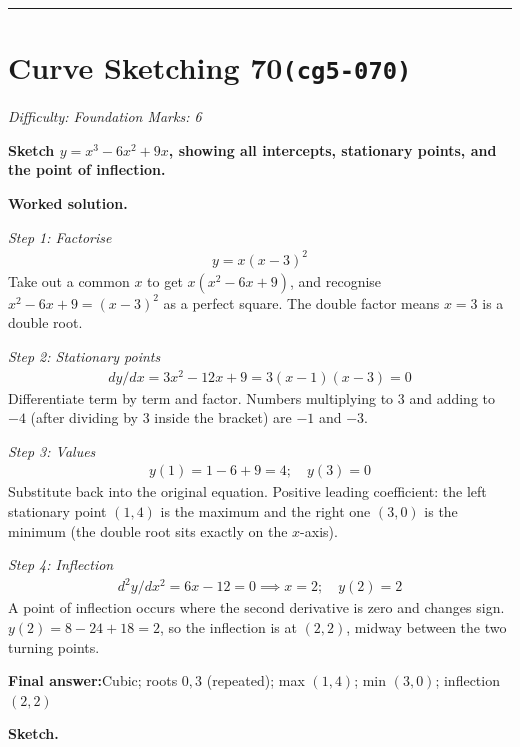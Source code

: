 \documentclass[11pt]{article}
\newcommand{\question}[1]{\par\medskip\noindent\textbf{#1}\par}
\begin{document}
\medskip\hrule

\section*{Curve Sketching 70\quad\small\texttt{(cg5-070)}}
\textit{Difficulty: Foundation \quad\textbar\quad Marks: 6}

\question{Sketch \( y = x^3 - 6x^2 + 9x \), showing all intercepts, stationary points, and the point of inflection.}

\textbf{Worked solution.}

\textit{Step 1: Factorise}
\[\begin{gathered}
y = x(x-3)^2
\end{gathered}\]
Take out a common \( x \) to get \( x(x^2 - 6x + 9) \), and recognise \( x^2 - 6x + 9 = (x-3)^2 \) as a perfect square. The double factor means \( x = 3 \) is a double root.

\textit{Step 2: Stationary points}
\[\begin{gathered}
dy/dx = 3x^2 - 12x + 9 = 3(x-1)(x-3) = 0
\end{gathered}\]
Differentiate term by term and factor. Numbers multiplying to \(3\) and adding to \(-4\) (after dividing by 3 inside the bracket) are \(-1\) and \(-3\).

\textit{Step 3: Values}
\[\begin{gathered}
y(1) = 1 - 6 + 9 = 4; \quad y(3) = 0
\end{gathered}\]
Substitute back into the original equation. Positive leading coefficient: the left stationary point \( (1, 4) \) is the maximum and the right one \( (3, 0) \) is the minimum (the double root sits exactly on the \( x \)-axis).

\textit{Step 4: Inflection}
\[\begin{gathered}
d^2y/dx^2 = 6x - 12 = 0 \implies x = 2; \quad y(2) = 2
\end{gathered}\]
A point of inflection occurs where the second derivative is zero and changes sign. \( y(2) = 8 - 24 + 18 = 2 \), so the inflection is at \( (2, 2) \), midway between the two turning points.

\begin{answerbox}
\textbf{Final answer:}\quad Cubic; roots \(\displaystyle 0, 3\) (repeated); max \(\displaystyle (1,4)\); min \(\displaystyle (3,0)\); inflection \(\displaystyle (2,2)\)
\end{answerbox}
\textbf{Sketch.}
\end{document}
